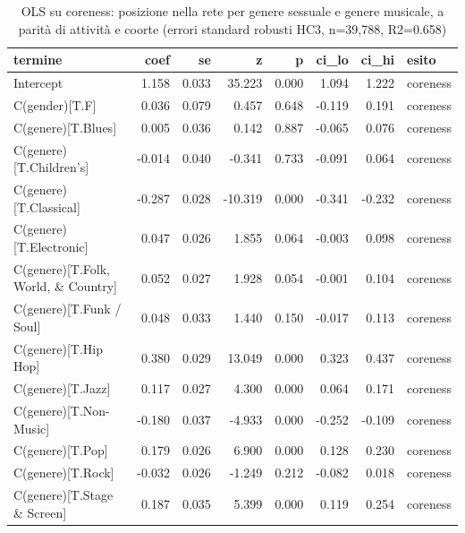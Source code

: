 \begin{table}
\centering
\caption{OLS su coreness: posizione nella rete per genere sessuale e genere musicale, a parità di attività e coorte (errori standard robusti HC3, n=39,788, R2=0.658)}
\label{tab:t3_regressione_coreness}
\begin{tabular}{lrrrrrrl}
\toprule
                                           termine &   coef &    se &       z &     p &  ci\_lo &  ci\_hi &    esito \\
\midrule
                                         Intercept &  1.158 & 0.033 &  35.223 & 0.000 &  1.094 &  1.222 & coreness \\
                                    C(gender)[T.F] &  0.036 & 0.079 &   0.457 & 0.648 & -0.119 &  0.191 & coreness \\
                                C(genere)[T.Blues] &  0.005 & 0.036 &   0.142 & 0.887 & -0.065 &  0.076 & coreness \\
                           C(genere)[T.Children's] & -0.014 & 0.040 &  -0.341 & 0.733 & -0.091 &  0.064 & coreness \\
                            C(genere)[T.Classical] & -0.287 & 0.028 & -10.319 & 0.000 & -0.341 & -0.232 & coreness \\
                           C(genere)[T.Electronic] &  0.047 & 0.026 &   1.855 & 0.064 & -0.003 &  0.098 & coreness \\
               C(genere)[T.Folk, World, \& Country] &  0.052 & 0.027 &   1.928 & 0.054 & -0.001 &  0.104 & coreness \\
                          C(genere)[T.Funk / Soul] &  0.048 & 0.033 &   1.440 & 0.150 & -0.017 &  0.113 & coreness \\
                              C(genere)[T.Hip Hop] &  0.380 & 0.029 &  13.049 & 0.000 &  0.323 &  0.437 & coreness \\
                                 C(genere)[T.Jazz] &  0.117 & 0.027 &   4.300 & 0.000 &  0.064 &  0.171 & coreness \\
                            C(genere)[T.Non-Music] & -0.180 & 0.037 &  -4.933 & 0.000 & -0.252 & -0.109 & coreness \\
                                  C(genere)[T.Pop] &  0.179 & 0.026 &   6.900 & 0.000 &  0.128 &  0.230 & coreness \\
                                 C(genere)[T.Rock] & -0.032 & 0.026 &  -1.249 & 0.212 & -0.082 &  0.018 & coreness \\
                       C(genere)[T.Stage \& Screen] &  0.187 & 0.035 &   5.399 & 0.000 &  0.119 &  0.254 & coreness \\

\end{tabular}
\end{table}
